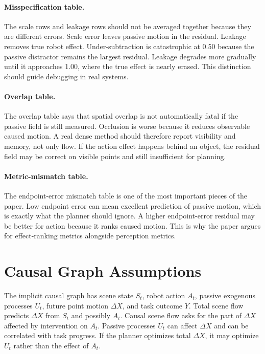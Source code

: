 \documentclass{article}
\begin{document}
\paragraph{Misspecification table.}
The scale rows and leakage rows should not be averaged together because they are
different errors.  Scale error leaves passive motion in the residual.  Leakage removes
true robot effect.  Under-subtraction is catastrophic at 0.50 because the passive
distractor remains the largest residual.  Leakage degrades more gradually until it
approaches 1.00, where the true effect is nearly erased.  This distinction should guide
debugging in real systems.

\paragraph{Overlap table.}
The overlap table says that spatial overlap is not automatically fatal if the passive
field is still measured.  Occlusion is worse because it reduces observable caused
motion.  A real dense method should therefore report visibility and memory, not only
flow.  If the action effect happens behind an object, the residual field may be correct
on visible points and still insufficient for planning.

\paragraph{Metric-mismatch table.}
The endpoint-error mismatch table is one of the most important pieces of the paper.
Low endpoint error can mean excellent prediction of passive motion, which is exactly what
the planner should ignore.  A higher endpoint-error residual may be better for action
because it ranks caused motion.  This is why the paper argues for effect-ranking metrics
alongside perception metrics.

\section{Causal Graph Assumptions}

The implicit causal graph has scene state $S_t$, robot action $A_t$, passive exogenous
processes $U_t$, future point motion $\Delta X$, and task outcome $Y$.  Total scene flow
predicts $\Delta X$ from $S_t$ and possibly $A_t$.  Causal scene flow asks for the part
of $\Delta X$ affected by intervention on $A_t$.  Passive processes $U_t$ can affect
$\Delta X$ and can be correlated with task progress.  If the planner optimizes total
$\Delta X$, it may optimize $U_t$ rather than the effect of $A_t$.
\end{document}
